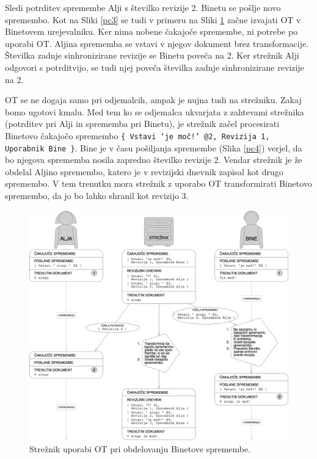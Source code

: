 \documentclass[a4paper, 12pt, twoside]{book}
\begin{document}
Sledi potrditev spremembe Alji s številko revizije 2. Binetu se pošlje novo spremembo. Kot na Sliki \ref{pc3} se tudi v primeru na Sliki \ref{pc5} začne izvajati OT v Binetovem urejevalniku. Ker nima nobene čakajoče spremembe, ni potrebe po uporabi OT. Aljina sprememba se vstavi v njegov dokument brez transformacije. Številka zadnje sinhronizirane revizije se Binetu poveča na 2. Ker strežnik Alji odgovori s potrditvijo, se tudi njej poveča številka zadnje sinhronizirane revizije na 2.

\pagebreak

OT se ne dogaja samo pri odjemalcih, ampak je nujna tudi na strežniku. Zakaj bomo ugotovi kmalu. Med tem ko se odjemalca ukvarjata z zahtevami strežnika (potrditev pri Alji in sprememba pri Binetu), je strežnik začel procesirati Binetovo čakajočo spremembo {\tt \{ Vstavi ‘je moč!’ @2, Revizija 1, Uporabnik Bine \}}. Bine je v času pošiljanja spremembe (Slika \ref{pc4}) verjel, da bo njegova sprememba nosila zapredno številko revizije 2. Vendar strežnik je že obdelal Aljino spremembo, katero je v revizijski dnevnik zapisal kot drugo spremembo. V tem trenutku mora strežnik z uporabo OT transformirati Binetovo spremembo, da jo bo lahko shranil kot revizijo 3.

\begin{figure}[placement h]
\begin{center}
\includegraphics[width=14cm]{pc5.png}
\end{center}
\caption{Strežnik uporabi OT pri obdelovanju Binetove spremembe.}
\label{pc5}
\end{figure}
\end{document}
